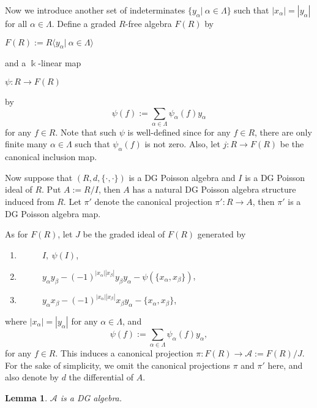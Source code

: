 \documentclass[a4paper,10pt]{amsart}
\newtheorem{lemma}[theorem]{Lemma}
\theoremstyle{definition}
\theoremstyle{remark}
\numberwithin{equation}{section}
\begin{document}
\subsubsection{} Now we introduce another set of indeterminates $\{y_{\alpha}|~\alpha\in
 \Lambda\}$ such that $|x_{\alpha}|=|y_{\alpha}|$ for all $\alpha\in
 \Lambda$. Define a graded $R$-free algebra $F(R)$ by
\begin{center}
$F(R):=R\langle y_{\alpha}|~\alpha\in \Lambda \rangle$
\end{center}
and a $\Bbbk$-linear map
\begin{center}
$\psi: R\rightarrow F(R)$
\end{center}
by
\[\psi(f):=\sum_{\alpha\in \Lambda}\psi_{\alpha}(f)y_{\alpha}\]
for any $f\in R$. Note that such $\psi$ is well-defined since for
any $f\in R$, there are only finite many $\alpha\in \Lambda$ such
that $\psi_{\alpha}(f)$ is not zero. Also, let $j: R\rightarrow F(R)$
be the canonical inclusion map.

Now suppose that $(R, d, \{\cdot, \cdot\})$ is a DG Poisson algebra and $I$ is a
DG Poisson ideal of $R$. Put $A:=R/I$, then $A$ has a natural DG
Poisson algebra structure induced from $R$. Let $\pi'$ denote the canonical
projection $\pi': R\rightarrow A$, then $\pi'$ is a DG Poisson
algebra map.

As for $F(R)$, let $J$ be the graded ideal of $F(R)$ generated by
\begin{center}
\begin{enumerate}
  \item $~~~~~~~~~~~~I, ~\psi(I)$,
  \item $~~~~~~~~~~~~y_{\alpha}y_{\beta}-(-1)^{|x_{\alpha}||x_{\beta}|}y_{\beta}y_{\alpha}-\psi(\{x_{\alpha},
x_{\beta}\})$,
  \item $~~~~~~~~~~~~y_{\alpha}x_{\beta}-(-1)^{|x_{\alpha}||x_{\beta}|}x_{\beta}y_{\alpha}-\{x_{\alpha},
x_{\beta}\}$,
\end{enumerate}
\end{center}
where $|x_{\alpha}|=|y_{\alpha}|$ for any $\alpha\in \Lambda$, and
\[\psi(f):=\sum_{\alpha\in \Lambda}\psi_{\alpha}(f)y_{\alpha},\]
for any $f\in R$. This induces a canonical projection $\pi: F(R)\rightarrow \mathcal{A}:=F(R)/J$. For the sake of simplicity, we omit the canonical projections $\pi$ and $\pi'$ here, and also denote by $d$ the differential of $A$.

\begin{lemma}\label{lem1}
$\mathcal{A}$ is a DG algebra.
\end{lemma}
\end{document}
